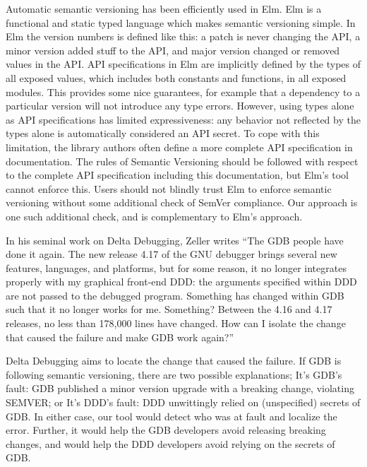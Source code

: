 Automatic semantic versioning has been efficiently used in Elm. Elm is
a functional and static typed language which makes semantic versioning
simple. In Elm the version numbers is defined like this: a patch is
never changing the API, a minor version added stuff to the API, and
major version changed or removed values in the API. API specifications
in Elm are implicitly defined by the types of all exposed values,
which includes both constants and functions, in all exposed
modules. This provides some nice guarantees, for example that a
dependency to a particular version will not introduce any type
errors. However, using types alone as API specifications has limited
expressiveness: any behavior not reflected by the types alone is
automatically considered an API secret. To cope with this limitation,
the library authors often define a more complete API specification in
documentation. The rules of Semantic Versioning should be followed
with respect to the complete API specification including this
documentation, but Elm's tool cannot enforce this. Users should not
blindly trust Elm to enforce semantic versioning without some
additional check of SemVer compliance. Our approach is one such
additional check, and is complementary to Elm's approach.

In his seminal work on Delta Debugging, Zeller writes ``The GDB people have done
it again. The new release 4.17 of the GNU debugger brings several new features,
languages, and platforms, but for some reason, it no longer integrates properly
with my graphical front-end DDD: the arguments specified within DDD are not
passed to the debugged program. Something has changed within GDB such that it
no longer works for me. Something? Between the 4.16 and 4.17 releases, no less
than 178,000 lines have changed. How can I isolate the change that caused the
failure and make GDB work again?''

Delta Debugging aims to locate the change that caused the failure. If GDB is
following semantic versioning, there are two possible explanations; It's GDB's
fault: GDB published a minor version upgrade with a breaking change, violating
SEMVER; or It's DDD's fault: DDD unwittingly relied on (unspecified) secrets of
GDB. In either case, our tool would detect who was at fault and localize the
error. Further, it would help the GDB developers avoid releasing breaking
changes, and would help the DDD developers avoid relying on the secrets of GDB.

